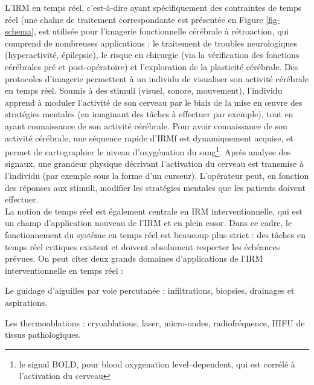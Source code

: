 \documentclass[10pt,a4paper]{report}
\begin{document}
L’IRM en temps réel, c’est-à-dire ayant spécifiquement des contraintes de temps réel (une chaîne de traitement correspondante est présentée en Figure \ref{fig-schema}, est utilisée pour l’imagerie fonctionnelle cérébrale à rétroaction, qui comprend de nombreuses applications : le traitement de troubles neurologiques (hyperactivité, épilepsie), le risque en chirurgie (via la vérification des fonctions cérébrales pré et post-opératoire) et l’exploration de la plasticité cérébrale. Des protocoles d’imagerie permettent à un individu de visualiser son activité cérébrale en temps réel. Soumis à des stimuli (visuel, sonore, mouvement), l’individu apprend à moduler l’activité de son cerveau par le biais de la mise en œuvre des stratégies mentales (en imaginant des tâches à effectuer par exemple), tout en ayant connaissance de son activité cérébrale. Pour avoir connaissance de son activité cérébrale, une séquence rapide d’\ac{IRMf} est dynamiquement acquise, et permet de cartographier le niveau d’oxygénation du sang\footnote{le signal BOLD, pour blood oxygenation level–dependent, qui est corrélé à l’activation du cerveau}. Après analyse des signaux, une grandeur physique décrivant l’activation du cerveau est transmise à l’individu (par exemple sous la forme d’un curseur). L’opérateur peut, en fonction des réponses aux stimuli, modifier les stratégies mentales que les patients doivent effectuer.\\

La notion de temps réel est également centrale en IRM interventionnelle, qui est un champ d’application nouveau de l’IRM et en plein essor. Dans ce cadre, le fonctionnement du système en temps réel est beaucoup plus strict : des tâches en temps réel critiques existent et doivent absolument respecter les échéances prévues. On peut citer deux grands domaines d’applications de l’IRM interventionnelle en temps réel :\\

\begin{description}
\item  Le guidage d’aiguilles par voie percutanée : infiltrations, biopsies, drainages et aspirations.
\item Les thermoablations : cryoablations, laser, micro-ondes, radiofréquence, \ac{HIFU} de tissus pathologiques.
\end{description}
\end{document}
